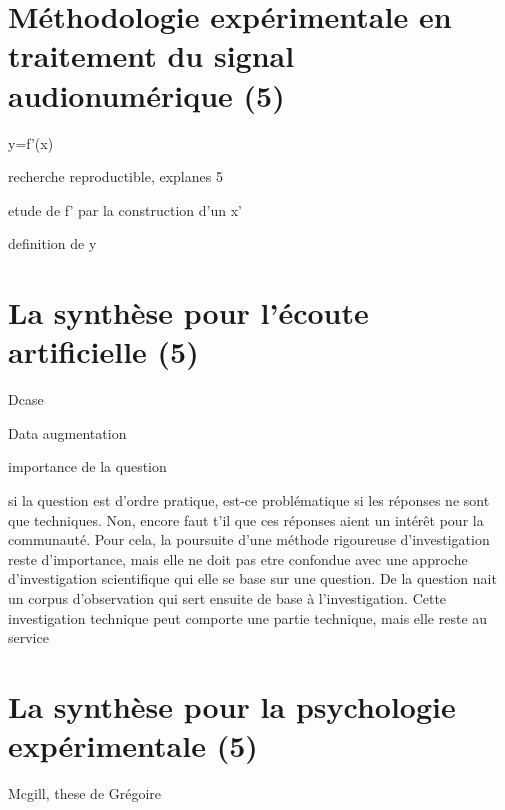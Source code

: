 \section{Méthodologie expérimentale en traitement du signal audionumérique (5)}

y=f'(x)

recherche reproductible, explanes 5

etude de f' par la construction d'un x'

definition de y

\section{La synthèse pour l'écoute artificielle (5)}

Dcase

Data augmentation

importance de la question

si la question est d'ordre pratique, est-ce problématique si les réponses ne sont que techniques. Non, encore faut t'il que ces réponses aient un intérêt pour la communauté. Pour cela, la poursuite d'une méthode rigoureuse d'investigation reste d'importance, mais elle ne doit pas etre confondue avec une approche d'investigation scientifique qui elle se base sur une question. De la question nait un corpus d'observation qui sert ensuite de base à l'investigation. Cette investigation technique peut comporte une partie technique, mais elle reste au service

\section{La synthèse pour la psychologie expérimentale (5)}

Mcgill, these de Grégoire
